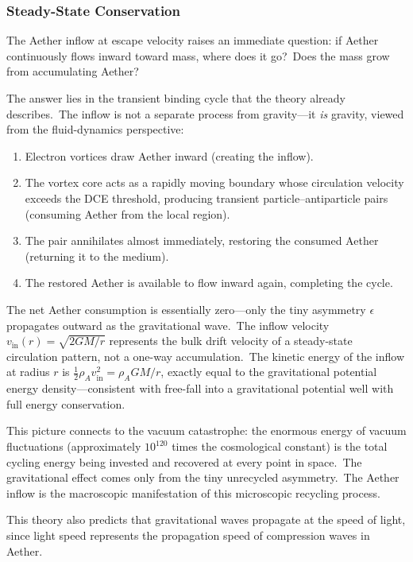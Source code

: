 ﻿\documentclass[12pt,letterpaper]{article}
\newcommand{\rhoa}{\rho_{\!A}}
\newcommand{\vin}{v_{\mathrm{in}}}
\begin{document}
\subsubsection{Steady-State Conservation}
\label{sec:steady-state}

The Aether inflow at escape velocity raises an immediate question: if Aether continuously
flows inward toward mass, where does it go?\ Does the mass grow from accumulating Aether?

The answer lies in the transient binding cycle that the theory already describes.\ The
inflow is not a separate process from gravity---it \emph{is} gravity, viewed from the fluid-dynamics perspective:

\begin{enumerate}[leftmargin=2em]
  \item Electron vortices draw Aether inward (creating the inflow).
  \item The vortex core acts as a rapidly moving boundary whose circulation velocity
    exceeds the DCE threshold, producing transient particle--antiparticle pairs
    (consuming Aether from the local region).
  \item The pair annihilates almost immediately, restoring the consumed Aether (returning it
    to the medium).
  \item The restored Aether is available to flow inward again, completing the cycle.
\end{enumerate}

The net Aether consumption is essentially zero---only the tiny asymmetry $\epsilon$
propagates outward as the gravitational wave.\ The inflow velocity $\vin(r) = \sqrt{2GM/r}$
represents the bulk drift velocity of a steady-state circulation pattern, not a one-way
accumulation.\ The kinetic energy of the inflow at radius $r$ is $\tfrac{1}{2}\rhoa \vin^2 =
\rhoa GM/r$, exactly equal to the gravitational potential energy density---consistent
with free-fall into a gravitational potential well with full energy conservation.

This picture connects to the vacuum catastrophe: the enormous energy of vacuum
fluctuations (approximately $10^{120}$ times the cosmological constant) is the total cycling
energy being invested and recovered at every point in space.\ The gravitational effect
comes only from the tiny unrecycled asymmetry.\ The Aether inflow is the macroscopic
manifestation of this microscopic recycling process.

This theory also predicts that gravitational waves propagate at the speed of light, since
light speed represents the propagation speed of compression waves in Aether.
\end{document}
